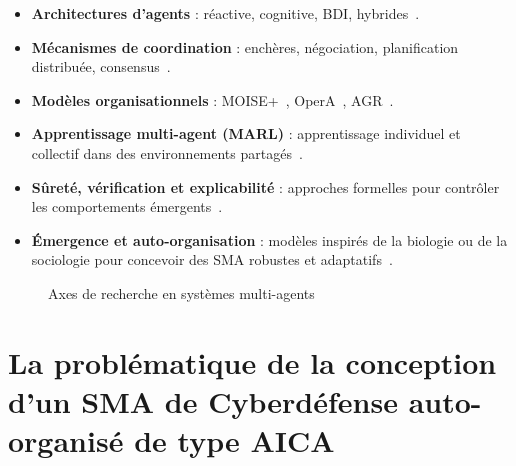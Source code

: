 \documentclass[ twoside,openright,titlepage,numbers=noenddot,headinclude,%
                footinclude=true,cleardoublepage=empty,abstractoff, %
                BCOR=5mm,paper=a4,fontsize=11pt,%
                french,american,%
                ]{scrreprt}
\begin{document}
\begin{itemize}
    \item \textbf{Architectures d'agents} : réactive, cognitive, BDI, hybrides~\cite{Georgeff1999}.
    \item \textbf{Mécanismes de coordination} : enchères, négociation, planification distribuée, consensus~\cite{Sandholm1999,Durfee1999}.
    \item \textbf{Modèles organisationnels} : MOISE+~\cite{Hubner2002,Hannoun2000}, OperA~\cite{Dignum2004}, AGR~\cite{Ferber2003}.
    \item \textbf{Apprentissage multi-agent (MARL)} : apprentissage individuel et collectif dans des environnements partagés~\cite{Zhang2021}.
    \item \textbf{Sûreté, vérification et explicabilité} : approches formelles pour contrôler les comportements émergents~\cite{Dennis2012,Boella2008}.
    \item \textbf{Émergence et auto-organisation} : modèles inspirés de la biologie ou de la sociologie pour concevoir des SMA robustes et adaptatifs~\cite{DiMarzoSerugendo2005,Heylighen2001}.
\end{itemize}

\begin{figure}[h]
    \centering
    \caption{Axes de recherche en systèmes multi-agents}
    \label{fig:panorama_sma}
\end{figure}


\section{La problématique de la conception d'un SMA de Cyberdéfense auto-organisé de type AICA}\label{sec:problematique-sma-aica}
\end{document}
